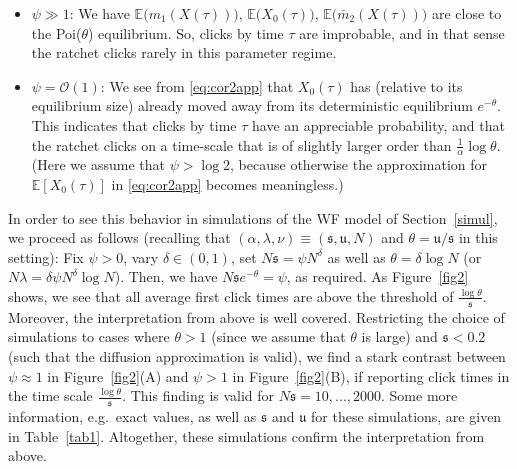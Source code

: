 \documentclass{imsart}
\theoremstyle{plain}
\theoremstyle{definition}
\begin{document}
\begin{itemize}
    \item $\psi \gg 1$: We have $\mathbb E\big(m_1(X(\tau))\big)$, $\mathbb E\big(X_0(\tau)\big)$, $\mathbb E\big(\bar m_2(X(\tau))\big)$ are close to the Poi($\theta$) equilibrium. So, clicks by time $\tau$ are improbable, and in that sense the ratchet clicks rarely in this parameter regime.
    \item $\psi = \mathcal O(1)$: We see from \eqref{eq:cor2app} that $X_0(\tau)$ has (relative to its equilibrium size) already moved away from its deterministic equilibrium $e^{-\theta}$. This indicates that clicks by time $\tau$ have an appreciable probability, and that the ratchet clicks on a time-scale that is of slightly larger order than $\tfrac 1\alpha \log\theta$.
    (Here we assume that $\psi > \log 2$, because otherwise the approximation for $\mathbb E[X_0(\tau)]$ in \eqref{eq:cor2app} becomes meaningless.) 
\end{itemize}

\noindent
In order to see this behavior in simulations of the WF model of Section~\ref{simul}, we proceed as follows (recalling that $(\alpha, \lambda, \nu) \equiv (\mathfrak s, \mathfrak u, N)$ and $\theta = \mathfrak u/\mathfrak s$ in this setting): Fix $\psi > 0$, vary $\delta \in (0,1)$, set $ N\mathfrak s = \psi N^{\delta}$ as well as $\theta = \delta \log N$ (or $N\lambda = \delta \psi N^{\delta} \log N$). Then, we have $N\mathfrak s e^{-\theta} = \psi$, as required. As Figure~\ref{fig2} shows, we see that all average first click times are above the threshold of $\tfrac{\log\theta}{\mathfrak s}$. Moreover, the interpretation from above is well covered. Restricting the choice of simulations to cases where $\theta > 1$ (since we assume that $\theta$ is large) and $\mathfrak s < 0.2$ (such that the diffusion approximation is valid), we find a stark contrast between $\psi \approx 1$ in Figure~\ref{fig2}(A) and $\psi > 1$ in Figure~\ref{fig2}(B), if reporting click times in the time scale $\tfrac{\log\theta}{\mathfrak s}$. This finding is valid for $N\mathfrak s = 10,..., 2000$. Some more information, e.g.\ exact values, as well as $\mathfrak s$ and $\mathfrak u$ for these simulations, are given in Table~\ref{tab1}. Altogether, these simulations confirm the interpretation from above.
\end{document}
